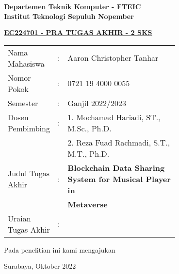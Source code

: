 \begin{flushleft}
  \textbf{Departemen Teknik Komputer - FTEIC}\\
  \textbf{Institut Teknologi Sepuluh Nopember}\\
\end{flushleft}

\begin{center}
  \underline{\textbf{EC224701 - PRA TUGAS AKHIR - 2 SKS}}
\end{center}

\begin{adjustwidth}{-0.2cm}{}
  \begin{tabular}{lcp{0.7\linewidth}}

    Nama Mahasiswa &:& Aaron Christopher Tanhar \\
    Nomor Pokok &:& 0721 19 4000 0055 \\

    Semester &:& Ganjil 2022/2023 \\

    Dosen Pembimbing &:& 1. Mochamad Hariadi, ST., M.Sc., Ph.D. \\
    & & 2. Reza Fuad Rachmadi, S.T., M.T., Ph.D. \\

    Judul Tugas Akhir &:& \textbf{Blockchain Data Sharing System for Musical Player in} \\
    & & \textbf{Metaverse} \\

    Uraian Tugas Akhir &:& \\
  \end{tabular}
\end{adjustwidth}

Pada penelitian ini kami mengajukan \lipsum[1][1-10]
\vspace{1ex}

\begin{flushright}
  Surabaya, Oktober 2022
\end{flushright}
\vspace{1ex}

